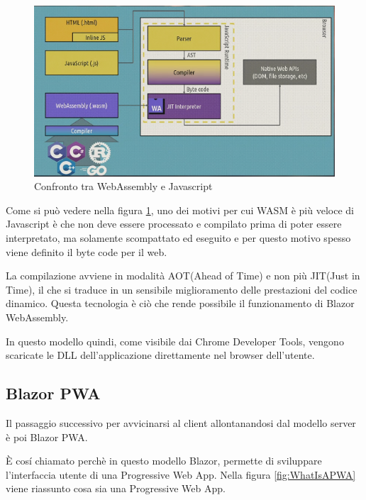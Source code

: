 \begin{figure}[H]
	\centerline{\includegraphics[scale=0.7]{figure/WasmVSJavascript.PNG}}
	\caption{Confronto tra WebAssembly e Javascript}
	\label{fig:WasmVSJavascript}
\end{figure}

Come si pu\`o vedere nella figura \ref{fig:WasmVSJavascript}, uno dei motivi per cui WASM \`e pi\`u veloce di Javascript \`e che non deve essere processato e compilato prima di poter essere interpretato, ma solamente scompattato ed eseguito e per questo motivo spesso viene definito il byte code per il web.

La compilazione avviene in modalit\`a AOT(Ahead of Time) e non pi\`u JIT(Just in Time), il che si traduce in un sensibile miglioramento delle prestazioni del codice dinamico.
Questa tecnologia \`e ci\`o che rende possibile il funzionamento di Blazor WebAssembly.

In questo modello quindi, come visibile dai Chrome Developer Tools, vengono scaricate le DLL dell'applicazione direttamente nel browser dell'utente.

\subsection{Blazor PWA}\label{sez:bpwa}
Il passaggio successivo per avvicinarsi al client allontanandosi dal modello server \`e poi Blazor PWA.

\`E cos\'i chiamato perch\`e in questo modello Blazor, permette di sviluppare l'interfaccia utente di una Progressive Web App.
Nella figura \ref{fig:WhatIsAPWA} viene riassunto cosa sia una Progressive Web App.

